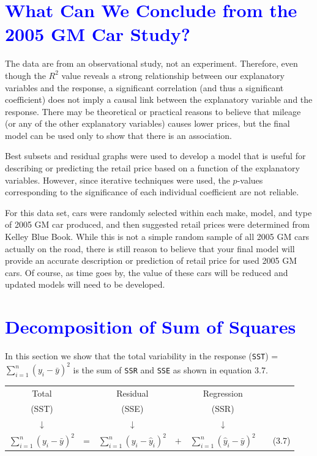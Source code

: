 \documentclass[
]{report}
\begin{document}
\hypertarget{section-32}{%
\section{\texorpdfstring{\textcolor{blue}{What Can We Conclude from the 2005 GM Car Study?}}{}}\label{section-32}}

The data are from an observational study, not an experiment. Therefore, even though the \(\scriptstyle {R}^2\) value reveals a strong relationship between our explanatory variables and the response, a significant correlation (and thus a significant coefficient) does not imply a causal link between the explanatory variable and the response. There may be theoretical or practical reasons to believe that mileage (or any of the other
explanatory variables) causes lower prices, but the final model can be used only to show that there is an association.

Best subsets and residual graphs were used to develop a model that is useful for describing or predicting the retail price based on a function of the explanatory variables. However, since iterative techniques were used, the \(\scriptstyle p\)-values corresponding to the significance of each individual coefficient are not reliable.

For this data set, cars were randomly selected within each make, model, and type of 2005 GM car produced, and then suggested retail prices were determined from Kelley Blue Book. While this is not a simple random sample of all 2005 GM cars actually on the road, there is still reason to believe that your final model will provide an accurate description or prediction of retail price for used 2005 GM cars. Of course, as time goes by, the value of these cars will be reduced and updated models will need to be developed.

\hypertarget{section-33}{%
\section{\texorpdfstring{\textcolor{blue}{Decomposition of Sum of Squares}}{}}\label{section-33}}

In this section we show that the total variability in the response (\texttt{SST}) = \(\scriptstyle \sum_{i=1}^n (y_i - \bar{y})^2\) is the sum of \texttt{SSR} and \texttt{SSE} as shown in equation 3.7.

\begin{table}[H]
\centering\centering
\begin{tabular}{>{}c>{}c>{}c>{}c>{}c>{}c>{}c}
\toprule
Total &  & Residual &  & Regression &  & \\
(SST) &  & (SSE) &  & (SSR) &  & \\
↓ &  & ↓ &  & ↓ &  & \\
$\sum_{i=1}^n (y_i - \bar{y})^2$ & = & $\sum_{i=1}^n (y_i - \hat{y}_i)^2$ & $+$ & $\sum_{i=1}^n (\hat{y}_i - \bar{y})^2$ &  & (3.7)\\
\bottomrule
\end{tabular}
\end{table}
\end{document}

